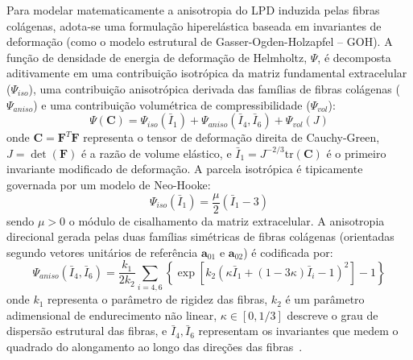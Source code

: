 Para modelar matematicamente a anisotropia do LPD induzida pelas fibras colágenas, adota-se uma formulação hiperelástica baseada em invariantes de deformação (como o modelo estrutural de Gasser-Ogden-Holzapfel -- GOH). A função de densidade de energia de deformação de Helmholtz, $\Psi$, é decomposta aditivamente em uma contribuição isotrópica da matriz fundamental extracelular ($\Psi_{iso}$), uma contribuição anisotrópica derivada das famílias de fibras colágenas ($\Psi_{aniso}$) e uma contribuição volumétrica de compressibilidade ($\Psi_{vol}$):
\begin{equation}
    \Psi(\bm{C}) = \Psi_{iso}(\bar{I}_1) + \Psi_{aniso}(\bar{I}_4, \bar{I}_6) + \Psi_{vol}(J)
\end{equation}
onde $\bm{C} = \bm{F}^T \bm{F}$ representa o tensor de deformação direita de Cauchy-Green, $J = \det(\bm{F})$ é a razão de volume elástico, e $\bar{I}_1 = J^{-2/3} \text{tr}(\bm{C})$ é o primeiro invariante modificado de deformação. A parcela isotrópica é tipicamente governada por um modelo de Neo-Hooke:
\begin{equation}
    \Psi_{iso}(\bar{I}_1) = \frac{\mu}{2} (\bar{I}_1 - 3)
\end{equation}
sendo $\mu > 0$ o módulo de cisalhamento da matriz extracelular. A anisotropia direcional gerada pelas duas famílias simétricas de fibras colágenas (orientadas segundo vetores unitários de referência $\bm{a}_{01}$ e $\bm{a}_{02}$) é codificada por:
\begin{equation}
    \Psi_{aniso}(\bar{I}_4, \bar{I}_6) = \frac{k_1}{2k_2} \sum_{i=4,6} \left\{ \exp\left[ k_2 \left( \kappa \bar{I}_1 + (1 - 3\kappa)\bar{I}_i - 1 \right)^2 \right] - 1 \right\}
\end{equation}
onde $k_1$ representa o parâmetro de rigidez das fibras, $k_2$ é um parâmetro adimensional de endurecimento não linear, $\kappa \in [0, 1/3]$ descreve o grau de dispersão estrutural das fibras, e $\bar{I}_4, \bar{I}_6$ representam os invariantes que medem o quadrado do alongamento ao longo das direções das fibras~\cite{zhang2024recursive}.

